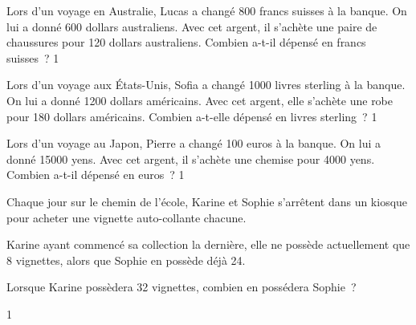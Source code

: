 \documentclass[a4paper,11pt]{report}
\begin{document}
\begin{exo} %
{Lors d'un voyage en Australie, Lucas a changé 800 francs suisses à la banque. On lui a donné 600 dollars australiens. Avec cet argent, il s'achète une paire de chaussures pour 120 dollars australiens. Combien a-t-il dépensé en francs suisses~?
\vspace{-0.3cm}
}{1}
\end{exo}

\begin{exo} %
{Lors d'un voyage aux États-Unis, Sofia a changé 1000 livres sterling à la banque. On lui a donné 1200 dollars américains. Avec cet argent, elle s'achète une robe pour 180 dollars américains. Combien a-t-elle dépensé en livres sterling~?
\vspace{-0.3cm}
}{1}
\end{exo}


\begin{exo} %
{Lors d'un voyage au Japon, Pierre a changé 100 euros à la banque. On lui a donné 15000 yens. Avec cet argent, il s'achète une chemise pour 4000 yens. Combien a-t-il dépensé en euros~?
\vspace{-0.3cm}
}{1}
\end{exo}
















\begin{exo}{
Chaque jour sur le chemin de l'école, Karine et Sophie s'arrêtent dans un kiosque pour acheter une vignette auto-collante chacune.

Karine ayant commencé sa collection la dernière, elle ne possède actuellement que 8 vignettes, alors que Sophie en possède déjà 24.

Lorsque Karine possèdera 32 vignettes, combien en possédera Sophie~?
\vspace{-0.3cm}
}{1}
\end{exo}
\end{document}
